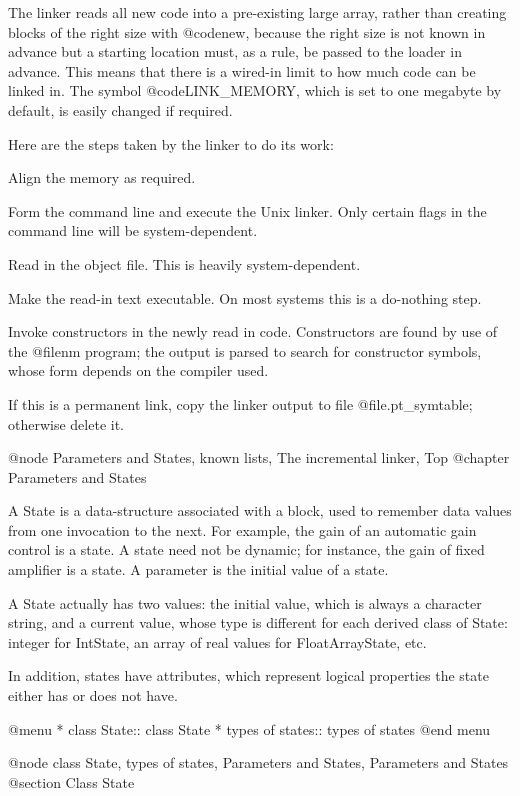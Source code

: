 The linker reads all new code into a pre-existing large array, rather
than creating blocks of the right size with @code{new}, because the
right size is not known in advance but a starting location must, as a
rule, be passed to the loader in advance.  This means that there is a
wired-in limit to how much code can be linked in.  The symbol
@code{LINK_MEMORY}, which is set to one megabyte by default, is easily
changed if required.

Here are the steps taken by the linker to do its work:

Align the memory as required.

Form the command line and execute the Unix linker.  Only certain flags
in the command line will be system-dependent.

Read in the object file.  This is heavily system-dependent.

Make the read-in text executable.  On most systems this is a do-nothing
step.

Invoke constructors in the newly read in code.  Constructors are found
by use of the @file{nm} program; the output is parsed to search for
constructor symbols, whose form depends on the compiler used.

If this is a permanent link, copy the linker output to file
@file{.pt_symtable}; otherwise delete it.

@node Parameters and States, known lists, The incremental linker, Top
@chapter Parameters and States

A State is a data-structure associated with a block, used to remember
data values from one invocation to the next.
For example, the gain of an automatic gain control is a state.
A state need not be dynamic; for instance, the gain of fixed
amplifier is a state.  A parameter is the initial value of a state.

A State actually has two values: the initial value, which is always
a character string, and a current value, whose type is different for
each derived class of State: integer for IntState, an array of real
values for FloatArrayState, etc.

In addition, states have attributes, which represent logical properties
the state either has or does not have.

@menu
* class State::                 class State
* types of states::             types of states
@end menu

@node class State, types of states, Parameters and States, Parameters and States
@section Class State

